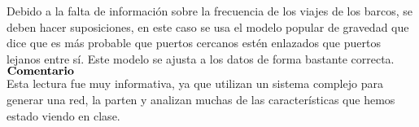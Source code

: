\documentclass[12pt]{extreport}
\begin{document}
	Debido a la falta de información sobre la frecuencia de los viajes de los barcos, se deben hacer suposiciones, en este caso se usa el modelo popular de gravedad que dice que es más probable que puertos cercanos estén enlazados que puertos lejanos entre sí. Este modelo se ajusta a los datos de forma  bastante correcta.\\
	
	$\bf{Comentario}$\\
	
	Esta lectura fue muy informativa, ya que utilizan un sistema complejo para generar una red, la parten y analizan muchas de las características que hemos estado viendo en clase.
	
\end{document}
